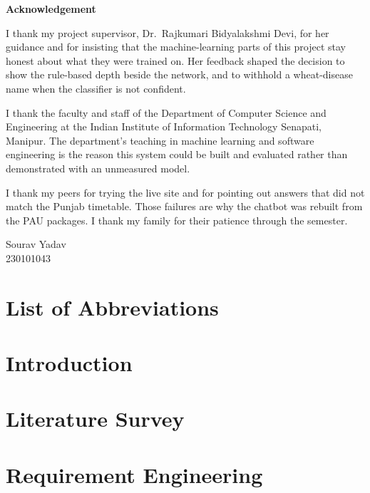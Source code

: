 \documentclass[a4paper, 11pt, oneside]{report}
\begin{document}
\pagebreak

\begin{center}
    {\LARGE \textbf{Acknowledgement}}
\end{center}
\vspace{1.2cm}

I thank my project supervisor, Dr.\ Rajkumari Bidyalakshmi Devi, for her guidance and for insisting that the machine-learning parts of this project stay honest about what they were trained on. Her feedback shaped the decision to show the rule-based depth beside the network, and to withhold a wheat-disease name when the classifier is not confident.

I thank the faculty and staff of the Department of Computer Science and Engineering at the Indian Institute of Information Technology Senapati, Manipur. The department's teaching in machine learning and software engineering is the reason this system could be built and evaluated rather than demonstrated with an unmeasured model.

I thank my peers for trying the live site and for pointing out answers that did not match the Punjab timetable. Those failures are why the chatbot was rebuilt from the PAU packages. I thank my family for their patience through the semester.

\vspace{1.2cm}
\hspace{7cm} Sourav Yadav\\
\hspace{7cm} 230101043

\tableofcontents
\listoffigures
\listoftables

\chapter*{List of Abbreviations}


\chapter{Introduction}


\chapter{Literature Survey}


\chapter{Requirement Engineering}

\end{document}

